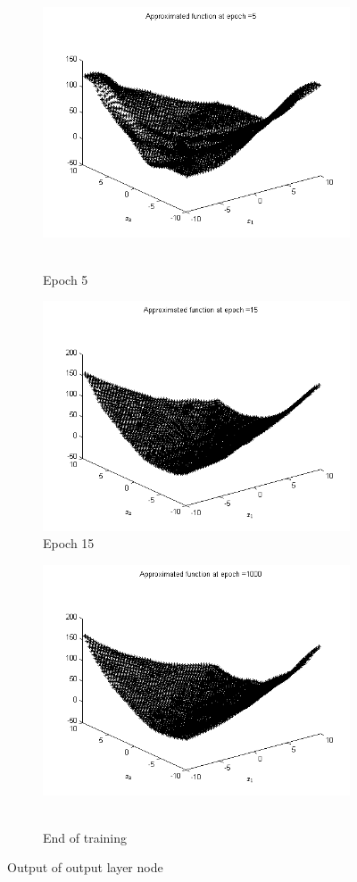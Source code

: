 \begin{figure}
  \begin{subfigure}{.5\textwidth}
  \centering
  \includegraphics[width=.8\linewidth]{Regression/bivariate/2layers_epoch_5.png}\
  \caption{Epoch 5}
\end{subfigure}%
\begin{subfigure}{.5\textwidth}
  \centering
  \includegraphics[width=.8\linewidth]{Regression/bivariate/2layers_epoch_15.png}
   \caption{Epoch 15}
  \end{subfigure}
  
  \begin{subfigure}{.5\textwidth}
  \centering
  \includegraphics[width=.8\linewidth]{Regression/bivariate/2layers_epoch_1000.png}\
  \caption{End of training}
\end{subfigure}%
  
\caption{Output of output layer node}
\end{figure}


